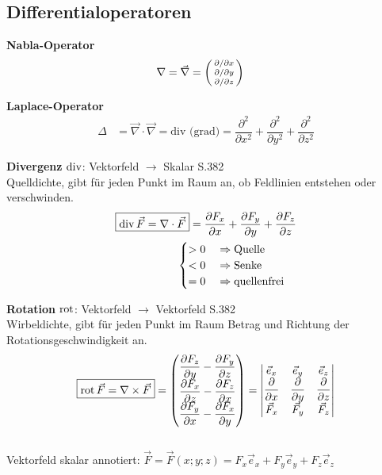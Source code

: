 \subsection{Differentialoperatoren}
\textbf{Nabla-Operator}
\begin{align*}
	\nabla & = \vec{\nabla} =
	\begin{psmallmatrix}
		\partial  / \partial x \\
		\partial  / \partial y \\
		\partial  / \partial z
	\end{psmallmatrix}
\end{align*}

\textbf{Laplace-Operator}
\begin{align*}
	\varDelta & = \vec{\nabla} \cdot \vec{\nabla} = \textrm{div (grad)} =
	\dfrac{\partial ^2}{\partial x^2}+\dfrac{\partial ^2}{\partial y^2}+\dfrac{\partial ^2}{\partial z^2}
\end{align*}

\textbf{Divergenz} $\operatorname{div}$: Vektorfeld $\rightarrow$ Skalar \qquad S.382\\
\small{Quelldichte, gibt für jeden Punkt im Raum an, ob Feldlinien entstehen oder verschwinden.}
\begin{align*}
	\boxed{\operatorname{div} \vec{F} = \nabla \cdot \vec{F}}   =  \dfrac{\partial F_x}{\partial x}
	+ \dfrac{\partial F_y}{\partial y} + \dfrac{\partial F_z}{\partial z} \\
	\begin{cases}
		> 0 \quad\Rightarrow \textnormal{Quelle} \\
		< 0 \quad\Rightarrow \textnormal{Senke}  \\
		= 0 \quad\Rightarrow \textnormal{quellenfrei}
	\end{cases}
\end{align*}

\textbf{Rotation} $\operatorname{rot}$: Vektorfeld $\rightarrow$ Vektorfeld \qquad S.382\\
\small{Wirbeldichte, gibt für jeden Punkt im Raum Betrag und Richtung der Rotationsgeschwindigkeit an.}
\begin{align*}
	\boxed{\operatorname{rot} \vec{F} = \nabla \times \vec{F} } =
	\begin{pmatrix}
		\dfrac{\partial F_z}{\partial y} - \dfrac{\partial F_y}{\partial z} \\
		\dfrac{\partial F_x}{\partial z} - \dfrac{\partial F_z}{\partial x} \\
		\dfrac{\partial F_y}{\partial x} - \dfrac{\partial F_x}{\partial y}
	\end{pmatrix} =
	\begin{vmatrix}
		\vec{e}_x                    & \vec{e}_y                     & \vec{e}_z                     \\
		\dfrac{\partial}{\partial x} & \dfrac{\partial }{\partial y} & \dfrac{\partial }{\partial z} \\
		\vec{F}_x                    & \vec{F}_y                     & \vec{F}_z
	\end{vmatrix}
\end{align*}\\
Vektorfeld skalar annotiert: $\vec{F} = \vec{F}(x;y;z) = F_x\vec{e}_x+F_y\vec{e}_y+F_z\vec{e}_z$\\

